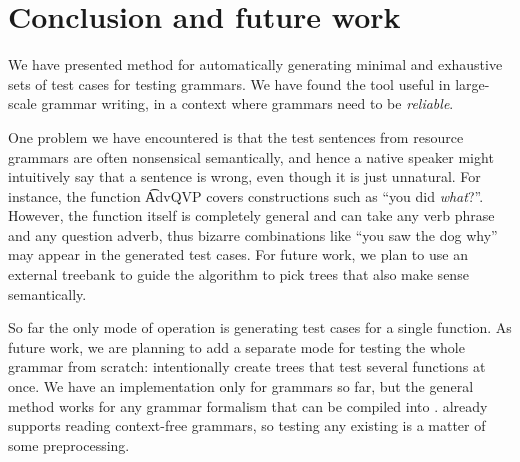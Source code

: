\section{Conclusion and future work}

We have presented method for automatically generating minimal and exhaustive sets of test cases for testing grammars.  We have found the tool useful in large-scale grammar writing, in a context where grammars need to be \emph{reliable}.

One problem
we have encountered is that the test sentences from resource grammars are often
nonsensical semantically, and hence a native speaker might intuitively
say that a sentence is wrong, even though it is just unnatural. 
For instance, the function \t{AdvQVP} covers constructions such as ``you
did \emph{what}?''. However, the function itself is completely general
and can take any verb phrase and any question adverb, thus  bizarre
combinations like ``you saw the dog why'' may appear in the generated
test cases. For future work, we plan to use an external treebank to
guide the algorithm to pick trees that also make sense semantically.

So far the only mode of operation is generating test cases for a
single function. 
As future work, we are planning to add a separate
mode for testing the whole grammar from scratch: intentionally create
trees that test several functions at once.
We have an implementation only for \gf{} grammars so far, but the
general method works for any grammar formalism that can be compiled
into \pmcfg{}. \gf{} already supports reading context-free grammars,
so testing any existing \cfg{} is a matter of some preprocessing. 
